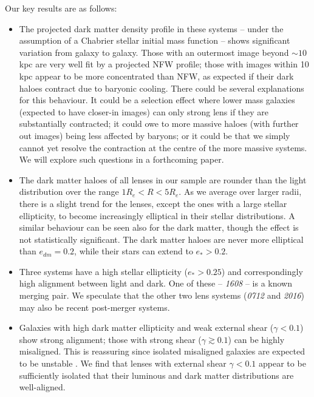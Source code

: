 \documentclass[useAMS,usenatbib]{mn2e}
\begin{document}
Our key results are as follows:

\begin{itemize}
\item The projected dark matter density profile in these systems -- under the assumption of a Chabrier stellar initial mass function -- shows significant variation from galaxy to galaxy. Those with an outermost image beyond $\sim 10$\,kpc are very well fit by a projected NFW profile; those with images within 10\,kpc appear to be more concentrated than NFW, as expected if their dark haloes contract due to baryonic cooling. There could be several explanations for this behaviour. It could be a selection effect where lower mass galaxies (expected to have closer-in images) can only strong lens if they are substantially contracted; it could owe to more massive haloes (with further out images) being less affected by baryons; or it could be that we simply cannot yet resolve the contraction at the centre of the more massive systems. We will explore such questions in a forthcoming paper.

\item The dark matter haloes of all lenses in our sample are rounder than the light distribution over the range $1R_e < R < 5R_e$. As we average over larger radii, there is a slight trend for the lenses, except the ones with a large stellar ellipticity, to become increasingly elliptical in their stellar distributions. A similar behaviour can be seen also for the dark matter, though the effect is not statistically significant. The dark matter haloes are never more elliptical than $e_{dm} = 0.2$, while their stars can extend to $e_* > 0.2$.

\item Three systems have a high stellar ellipticity ($e_* > 0.25$) and correspondingly high alignment between light and dark. One of these -- {\it1608} -- is a known merging pair. We speculate that the other two lens systems ({\it0712} and {\it2016}) may also be recent post-merger systems. 

\item Galaxies with high dark matter ellipticity and weak external shear ($\gamma < 0.1$) show strong alignment; those with strong shear ($\gamma \gtrsim 0.1$) can be highly misaligned. This is reassuring since isolated misaligned galaxies are expected to be unstable \citep[e.g.][]{1979ApJ...233..872H,1988A&A...206..269M,2007ApJ...670.1027A,2015arXiv150203429D}. We find that lenses with external shear $\gamma < 0.1$ appear to be sufficiently isolated that their luminous and dark matter distributions are well-aligned.

\end{itemize}
\end{document}
